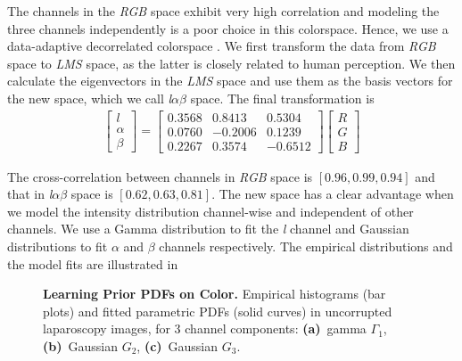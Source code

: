 The channels in the \emph{RGB} space exhibit very high correlation and modeling the three channels independently is a poor choice in this colorspace. Hence, we use a data-adaptive decorrelated colorspace \cite{reinhard2001color}. We first transform the data from \emph{RGB} space to \emph{LMS} space, as the latter is closely related to human perception. We then calculate the eigenvectors in the \emph{LMS} space and use them as the basis vectors for the new space, which we call \emph{l$\alpha\beta$} space. The final transformation is 
\begin{align}
    \begin{bmatrix}
    l \\ \alpha \\ \beta
    \end{bmatrix}
    = 
    \begin{bmatrix}
    0.3568 & 0.8413 & 0.5304 \\
    0.0760 & -0.2006 & 0.1239 \\
    0.2267 & 0.3574 & -0.6512  
    \end{bmatrix}
    \begin{bmatrix}
    R \\ G \\ B
    \end{bmatrix}
\end{align}

The cross-correlation between channels in \emph{RGB} space is $\left[ 0.96, 0.99, 0.94\right]$ and that in \emph{l$\alpha\beta$} space is $\left[ 0.62, 0.63, 0.81 \right]$. The new space has a clear advantage when we model the intensity distribution channel-wise and independent of other channels. We use a Gamma distribution to fit the \textit{l} channel and Gaussian distributions to fit $\alpha$ and $\beta$ channels respectively. The empirical distributions and the model fits are illustrated in 

\begin{figure}[!t]
    \caption
    {
        {\bf Learning Prior PDFs on Color.}
        Empirical histograms (bar plots) and fitted parametric PDFs (solid curves) in uncorrupted laparoscopy images, for 3 channel components: {\bf
            (a)}~gamma $\Gamma_1$, {\bf (b)}~Gaussian $G_2$, {\bf (c)}~Gaussian $G_3$.
    }
    \label{fig:intensityDist}
\end{figure}


